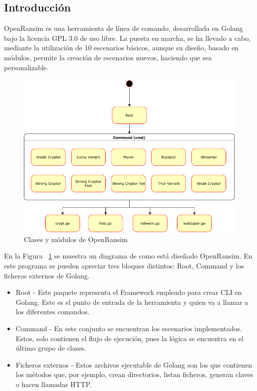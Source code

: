 \documentclass[a4paper,12pt]{article}
\begin{document}
\subsection{Introducción}
OpenRansim es una herramienta de línea de comando, desarrollada en Golang bajo la licencia GPL 3.0 de uso libre. La puesta en marcha, se ha llevado a cabo, mediante la utilización de 10 escenarios básicos, aunque su diseño, basado en módulos, permite la creación de escenarios nuevos, haciendo que sea personalizable.
\begin{figure}[H]
	\centering
	\includegraphics[scale=0.55]{imagenes/modules.png}
	\caption[Clases y módulos de OpenRansim]{Clases y módulos de OpenRansim}
	\label{fig:figure2}
\end{figure}
En la Figura ~\ref{fig:figure2} se muestra un diagrama de como está diseñado OpenRansim. En este programa se pueden apreciar tres bloques distintos: Root, Command y los ficheros externos de Golang.
\begin{itemize}
	\item Root - Este paquete representa el Framework empleado para crear CLI en Golang. Este es el punto de entrada de la herramienta y quien va a llamar a los diferentes comandos.
	\item Command - En este conjunto se encuentran los escenarios implementados. Estos, solo contienen el flujo de ejecución, pues la lógica se encuentra en el último grupo de clases. 
	\item Ficheros externos - Estos archivos ejecutable de Golang son los que contienen los métodos que, por ejemplo, crean directorios, listan ficheros, generan claves o hacen llamadas HTTP. 
\end{itemize}
\end{document}
